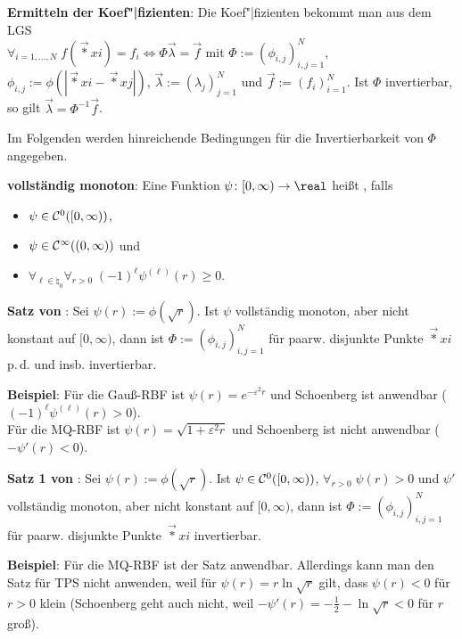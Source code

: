 \textbf{Ermitteln der Koef"|fizienten}:
Die Koef"|fizienten bekommt man aus dem LGS\\
$\forall_{i=1,\dotsc,N}\; f(\vec*{x}{i}) = f_i
\iff \Phi\vec{\lambda} = \vec{f}$
mit $\Phi := (\phi_{i,j})_{i,j=1}^N$, $\phi_{i,j} := \phi(|\vec*{x}{i} - \vec*{x}{j}|)$,
$\vec{\lambda} := (\lambda_j)_{j=1}^N$ und $\vec{f} := (f_i)_{i=1}^N$.
Ist $\Phi$ invertierbar, so gilt $\vec{\lambda} = \Phi^{-1} \vec{f}$.

\linie

Im Folgenden werden hinreichende Bedingungen für die Invertierbarkeit von $\Phi$
angegeben.

\textbf{vollständig monoton}:
Eine Funktion $\psi\colon [0, \infty) \to \real$ heißt , falls
\begin{itemize}
    \item
    $\psi \in \mathcal{C}^0([0, \infty))$,
    
    \item
    $\psi \in \mathcal{C}^\infty((0, \infty))$ und
    
    \item
    $\forall_{\ell \in \natural_0} \forall_{r > 0}\; (-1)^\ell \psi^{(\ell)}(r) \ge 0$.
\end{itemize}

\textbf{Satz von }:
Sei $\psi(r) := \phi(\sqrt{r})$.
Ist $\psi$ vollständig monoton, aber nicht konstant auf $[0, \infty)$,
dann ist $\Phi := (\phi_{i,j})_{i,j=1}^N$ für paarw. disjunkte Punkte
$\vec*{x}{i}$ p.\,d. und insb. invertierbar.

\textbf{Beispiel}:
Für die Gauß-RBF ist $\psi(r) = e^{-\varepsilon^2 r}$
und Schoenberg ist anwendbar
($(-1)^\ell \psi^{(\ell)}(r) > 0$).\\
Für die MQ-RBF ist $\psi(r) = \sqrt{1 + \varepsilon^2 r}$
und Schoenberg ist nicht anwendbar
($-\psi'(r) < 0$).

\linie

\textbf{Satz 1 von }:
Sei $\psi(r) := \phi(\sqrt{r})$.
Ist $\psi \in \mathcal{C}^0([0, \infty))$,
$\forall_{r>0}\; \psi(r) > 0$ und
$\psi'$ vollständig monoton, aber nicht konstant auf $[0, \infty)$,
dann ist $\Phi := (\phi_{i,j})_{i,j=1}^N$ für paarw. disjunkte Punkte
$\vec*{x}{i}$ invertierbar.

\textbf{Beispiel}:
Für die MQ-RBF ist der Satz anwendbar.
Allerdings kann man den Satz für TPS nicht anwenden,
weil für $\psi(r) = r \ln\sqrt{r}$ gilt,
dass $\psi(r) < 0$ für $r > 0$ klein
(Schoenberg geht auch nicht, weil $-\psi'(r) = -\frac{1}{2} - \ln\sqrt{r} < 0$
für $r$ groß).

